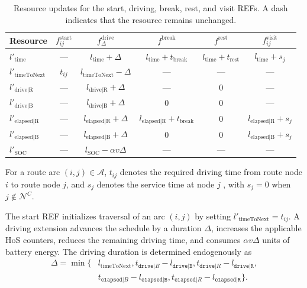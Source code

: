 \documentclass[3p,11pt,authoryear]{elsarticle}  %
\begin{document}
\begin{table}[!htbp]
\centering
\caption{Resource updates for the start,
driving, break, rest, and visit REFs.
A dash indicates that the resource remains unchanged.}
\label{tab:ref_temporal_hos}
\small
\setlength{\tabcolsep}{4pt}
\renewcommand{\arraystretch}{1.15}
\begin{tabular}{@{}lccccc@{}}
\toprule
\textbf{Resource}
& \(f^{\mathrm{start}}_{ij}\)
& \(f^{\mathrm{drive}}_{\Delta}\)
& \(f^{\mathrm{break}}\)
& \(f^{\mathrm{rest}}\)
& \(f^{\mathrm{visit}}_{ij}\) \\
\midrule
\(l'_{\mathrm{time}}\)
& ---
& \(l_{\mathrm{time}}+\Delta\)
& \(l_{\mathrm{time}}+t_{\mathrm{break}}\)
& \(l_{\mathrm{time}}+t_{\mathrm{rest}}\)
& \(l_{\mathrm{time}}+s_j\) \\

\(l'_{\mathrm{timeToNext}}\)
& \(t_{ij}\)
& \(l_{\mathrm{timeToNext}}-\Delta\)
& ---
& ---
& --- \\

\(l'_{\mathrm{drive|R}}\)
& ---
& \(l_{\mathrm{drive|R}}+\Delta\)
& ---
& \(0\)
& --- \\

\(l'_{\mathrm{drive|B}}\)
& ---
& \(l_{\mathrm{drive|B}}+\Delta\)
& \(0\)
& \(0\)
& --- \\

\(l'_{\mathrm{elapsed|R}}\)
& ---
& \(l_{\mathrm{elapsed|R}}+\Delta\)
& \(l_{\mathrm{elapsed|R}}+t_{\mathrm{break}}\)
& \(0\)
& \(l_{\mathrm{elapsed|R}}+s_j\) \\

\(l'_{\mathrm{elapsed|B}}\)
& ---
& \(l_{\mathrm{elapsed|B}}+\Delta\)
& \(0\)
& \(0\)
& \(l_{\mathrm{elapsed|B}}+s_j\) \\

\(l'_{\mathrm{SOC}}\)
& ---
& \(l_{\mathrm{SOC}}-\alpha v \Delta\)
& ---
& ---
& --- \\
\bottomrule
\end{tabular}%
\end{table}


For a route arc $(i,j)\in\mathcal{A}$, $t_{ij}$ denotes the required driving time from route node $i$ to route node $j$, and $s_j$ denotes the service time at node $j$ , with $s_j=0$ when $j\notin\mathcal{N}^{C}$. 

The start REF initializes traversal of an arc $(i,j)$ by setting
$l'_{\mathrm{timeToNext}}=t_{ij}$. A driving extension advances the
schedule by a duration $\Delta$, increases the applicable HoS counters,
reduces the remaining driving time, and consumes $\alpha v \Delta$ units
of battery energy. The driving duration is determined endogenously as
\begin{align*}
\Delta
=
\min\bigl\{
&l_{\mathrm{timeToNext}},
t_{\texttt{drive}|B}-l_{\texttt{drive|B}},
t_{\texttt{drive}|R}-l_{\texttt{drive|R}},
\nonumber\\
&t_{\texttt{elapsed}|B}-l_{\texttt{elapsed|B}},
t_{\texttt{elapsed}|R}-l_{\texttt{elapsed|R}}
\bigr\}.
\end{align*}
\end{document}
